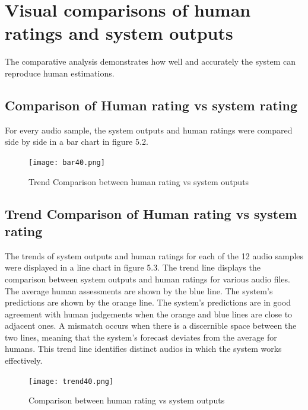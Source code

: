 \documentclass[Arial,12pt,openright,twoside]{book}
\begin{document}
\section{Visual comparisons of human ratings and system outputs }
The comparative analysis demonstrates how well and accurately the system  can reproduce human estimations.
\subsection{Comparison of  Human rating  vs system rating }
For every audio sample, the system outputs and human ratings were compared side by side in a bar chart in figure 5.2.
\vspace{10pt} %
 \begin{figure}[H]
    \centering
    \texttt{[image: bar40.png]}
    \caption{Trend Comparison between human rating vs system outputs}
    \label{fig:system_architecture}
\end{figure}
\vspace{10pt} %
\subsection{Trend Comparison of  Human rating  vs system rating }
The trends of system outputs and human ratings for each of the 12 audio samples were displayed in a line chart in figure 5.3. The trend line displays the comparison between system outputs and human ratings for various audio files. The average human assessments are shown by the blue line. The system's predictions are shown by the orange line. The system's predictions are in good agreement with human judgements when the orange and blue lines are close to adjacent ones.  A mismatch occurs when there is a discernible space between the two lines, meaning that the system's forecast deviates from the average for humans. This trend line identifies distinct audios in which the system works effectively.
\vspace{10pt} %
\begin{figure}[H]
    \centering
    \texttt{[image: trend40.png]}
    \caption{Comparison between human rating vs system outputs}
    \label{fig:system_architecture}
\end{figure} 
\vspace{10pt} %
\end{document}
